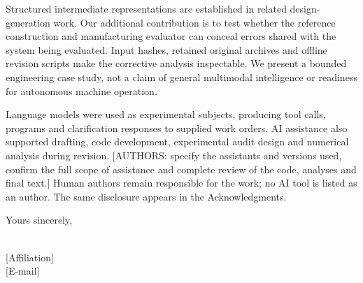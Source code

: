 \documentclass[11pt]{article}
\begin{document}
\noindent Structured intermediate representations are established in related design-generation work. Our additional contribution is to test whether the reference construction and manufacturing evaluator can conceal errors shared with the system being evaluated. Input hashes, retained original archives and offline revision scripts make the corrective analysis inspectable. We present a bounded engineering case study, not a claim of general multimodal intelligence or readiness for autonomous machine operation.


\noindent Language models were used as experimental subjects, producing tool calls, programs and clarification responses to supplied work orders. AI assistance also supported drafting, code development, experimental audit design and numerical analysis during revision. [AUTHORS: specify the assistants and versions used, confirm the full scope of assistance and complete review of the code, analyses and final text.] Human authors remain responsible for the work; no AI tool is listed as an author. The same disclosure appears in the Acknowledgments.

\vspace{1.0em}

\noindent Yours sincerely,

\vspace{1.5em}

\\
{[Affiliation]}\\
{[E-mail]} \quad {[ORCID]}
\end{document}
